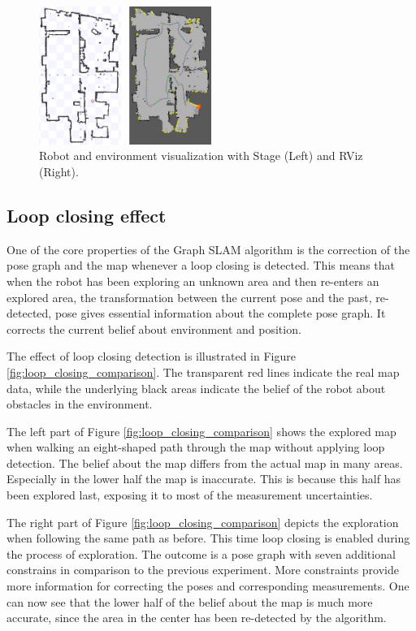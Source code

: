 \documentclass{ba-kecs}
\begin{document}
\begin{figure}[htbp]
	\centering
		\includegraphics[width=0.50\textwidth]{figures/Stage_and_rviz.jpg}
	\caption{Robot and environment visualization with Stage (Left) and RViz (Right).}
	\label{fig:stage_and_rviz}
\end{figure}

\subsection{Loop closing effect}
\label{sec:loopClosing}
One of the core properties of the Graph SLAM algorithm is the correction of the pose graph and the map whenever a loop closing is detected. This means that when the robot has been exploring an unknown area and then re-enters an explored area, the transformation between the current pose and the past, re-detected, pose gives essential information about the complete pose graph. It corrects the current belief about environment and position.

The effect of loop closing detection is illustrated in Figure \ref{fig:loop_closing_comparison}. The transparent red lines indicate the real map data, while the underlying black areas indicate the belief of the robot about obstacles in the environment.

The left part of Figure \ref{fig:loop_closing_comparison} shows the explored map when walking an eight-shaped path through the map without applying loop detection. The belief about the map differs from the actual map in many areas. Especially in the lower half the map is inaccurate. This is because this half has been explored last, exposing it to most of the measurement uncertainties.

The right part of Figure \ref{fig:loop_closing_comparison} depicts the exploration when following the same path as before. This time loop closing is enabled during the process of exploration. The outcome is a pose graph with seven additional constrains in comparison to the previous experiment. More constraints provide more information for correcting the poses and corresponding measurements. One can now see that the lower half of the belief about the map is much more accurate, since the area in the center has been re-detected by the algorithm.
\end{document}
